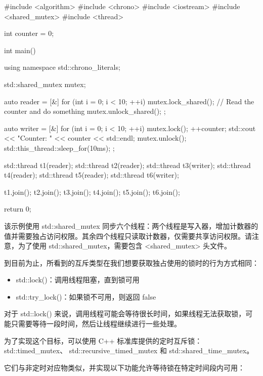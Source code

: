 \begin{cpp}
#include <algorithm>
#include <chrono>
#include <iostream>
#include <shared_mutex>
#include <thread>

int counter = 0;

int main() {
    using namespace std::chrono_literals;

    std::shared_mutex mutex;

    auto reader = [&] {
        for (int i = 0; i < 10; ++i) {
            mutex.lock_shared();
            // Read the counter and do something
            mutex.unlock_shared();
        }
    };

    auto writer = [&] {
        for (int i = 0; i < 10; ++i) {
            mutex.lock();
            ++counter;
            std::cout << "Counter: " << counter << std::endl;
            mutex.unlock();
            std::this_thread::sleep_for(10ms);
        }
    };

    std::thread t1(reader);
    std::thread t2(reader);
    std::thread t3(writer);
    std::thread t4(reader);
    std::thread t5(reader);
    std::thread t6(writer);

    t1.join();
    t2.join();
    t3.join();
    t4.join();
    t5.join();
    t6.join();

    return 0;
}
\end{cpp}

该示例使用 std::shared\_mutex 同步六个线程：两个线程是写入器，增加计数器的值并需要独占访问权限。其余四个线程只读取计数器，仅需要共享访问权限。请注意，为了使用 std::shared\_mutex，需要包含 <shared\_mutex> 头文件。


到目前为止，所看到的互斥类型在我们想要获取独占使用的锁时的行为方式相同：

\begin{itemize}
\item
std::lock()：调用线程阻塞，直到锁可用

\item
std::try\_lock()：如果锁不可用，则返回 false
\end{itemize}

对于 std::lock() 来说，调用线程可能会等待很长时间，如果线程无法获取锁，可能只需要等待一段时间，然后让线程继续进行一些处理。

为了实现这个目标，可以使用 C++ 标准库提供的定时互斥锁： std::timed\_mutex、 std::recursive\_timed\_mutex 和 std::shared\_time\_mutex。

它们与非定时对应物类似，并实现以下功能允许等待锁在特定时间段内可用：

